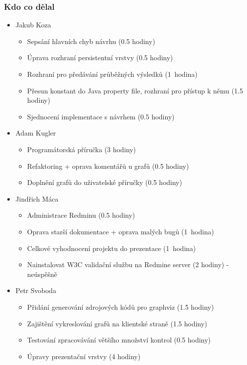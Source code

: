 \documentclass{beamer}
\begin{document}
\begin{frame}[allowframebreaks]\frametitle{Kdo co dělal} 
  \begin{itemize}
    \item Jakub Koza
      \begin{itemize}
       \item Sepsání hlavních chyb návrhu (0.5 hodiny)
			 \item Úprava rozhraní persistentní vrstvy (0.5 hodiny)
			 \item Rozhraní pro předávání průběžných výsledků (1~hodina)
       \item Přesun konstant do Java property file, rozhraní pro přístup k němu (1.5 hodiny)
			 \item Sjednocení implementace s návrhem (0.5 hodiny)
     \end{itemize}

    \item Adam Kugler
      \begin{itemize}
       \item Programátorská příručka (3 hodiny)
       \item Refaktoring + oprava komentářů u grafů (0.5 hodiny)
       \item Doplnění grafů do uživatelské příručky (0.5 hodiny)
     \end{itemize}

    \item Jindřich Máca
      \begin{itemize}
       \item Administrace Redminu	(0.5 hodiny)	
			 \item Oprava starší dokumentace + oprava malých bugů (1~hodina)
			 \item Celkové vyhodnocení projektu do prezentace (1~hodina)
			 \item Nainstalovat W3C validační službu na Redmine server (2 hodiny) - neúspěšně
     \end{itemize}

    \item Petr Svoboda
      \begin{itemize}
	\item Přidání generování zdrojových kódů pro graphviz (1.5 hodiny)
	\item Zajištění vykreslování grafů na klientské straně (1.5 hodiny)
	\item Testování zpracovávání většího množství kontrol (0.5 hodiny)
	\item Úpravy prezentační vrstvy (4 hodiny)
     \end{itemize}
   \end{itemize}  
\end{frame} 
\end{document}
